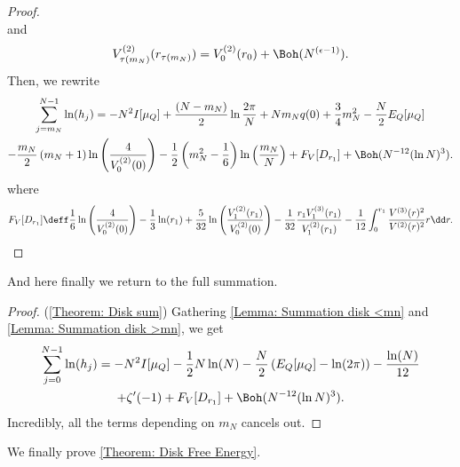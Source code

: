 \begin{proof}
\begin{equation}
	\end{equation}
	and
	\begin{equation}
		V^{(2)}_{\tau(m_N)}(r_{\tau(m_N)}) = V^{(2)}_0(r_0) + \Boh(N^{(\epsilon-1)}).
	\end{equation}
	Then, we rewrite
	\begin{multline}
				\sum_{j=m_N}^{N-1} \ln (h_j) = -N^2 I[\mu_Q] + \frac{(N-m_N)}{2} \ln{\frac{2\pi}{N}} +  N m_N q(0) + \frac{3}{4} m_N^2 - \frac{N}{2} E_Q[\mu_Q] \\ - \frac{m_N}{2} \left(m_N + 1\right) \ln{\left(\frac{4}{V^{(2)}_0(0)}\right)} - \frac{1}{2} \left( m_N^2 - \frac{1}{6} \right) \ln{\left(\frac{m_N}{N}\right)} + F_V[D_{r_1}] + \Boh(N^{-12} (\ln N)^3).
	\end{multline}
	where
	\begin{equation}
		 F_V[D_{r_1}] \deff \frac{1}{6} \ln{\left(\frac{4}{V^{(2)}_0(0)}\right)} - \frac{1}{3} \ln(r_1) + \frac{5}{32} \ln\left( \frac{V^{(2)}_1(r_1)}{V^{(2)}_{0}(0)} \right) - \frac{1}{32} \frac{r_1  V^{(3)}_1(r_1)}{V^{(2)}_1(r_1)} - \frac{1}{12} \int_{0}^{r_1} \frac{V^{(3)}(r)^2}{V^{(2)}(r)^{2}} r \dd r.
	\end{equation}
\end{proof}

And here finally we return to the full summation.

\begin{proof} (\autoref{Theorem: Disk sum})
	Gathering \autoref{Lemma: Summation disk <mn} and \autoref{Lemma: Summation disk >mn}, we get
	\begin{multline}
		\sum_{j=0}^{N-1} \ln (h_j) = -N^2 I[\mu_Q] - \frac{1}{2} N \ln(N)  -\frac{N}{2} \left( E_Q[\mu_Q] - \ln(2\pi) \right) - \frac{\ln(N)}{12} \\ + \zeta'(-1) + F_V[D_{r_1}] + \Boh(N^{-12} (\ln N)^3).
	\end{multline}
	Incredibly, all the terms depending on $m_N$ cancels out.
\end{proof}


We finally prove \autoref{Theorem: Disk Free Energy}.

